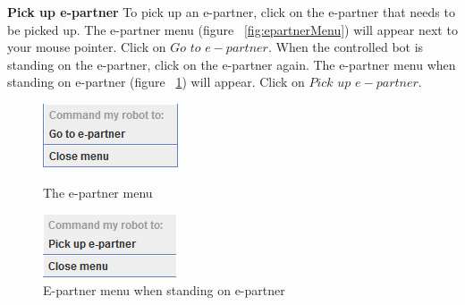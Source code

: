 \raggedright{\textbf{Pick up e-partner}}
To pick up an e-partner, click on the e-partner that needs to be picked up. The e-partner menu (figure ~\ref{fig:epartnerMenu}) will appear next to your mouse pointer. Click on $Go$ $to$ $e-partner$. When the controlled bot is standing on the e-partner, click on the e-partner again. The e-partner menu when standing on e-partner (figure ~\ref{fig:epartnerMenu2}) will appear. Click on $Pick$ $up$ $e-partner$.
\\
\begin{figure}[h]
\begin{minipage}{0.5\textwidth}
  \centering
  \includegraphics[width=.5\linewidth]{NewFeatures/hpg-epartner-menu1.png}
  \caption{The e-partner menu}
  \label{fig:epartnerMenu}
\end{minipage}\hfill
\begin{minipage}{0.5\textwidth}
  \centering
  \includegraphics[width=.5\linewidth]{NewFeatures/hpg-epartner-menu2.png}
  \caption{E-partner menu when standing on e-partner}
  \label{fig:epartnerMenu2}
\end{minipage}
\end{figure}

